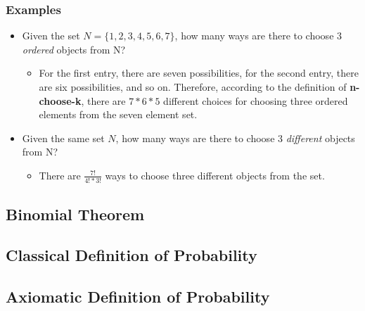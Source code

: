 \documentclass{article}
\begin{document}
\subsubsection{Examples}
\begin{itemize}
    \item Given the set $N = \{1, 2, 3, 4, 5, 6, 7\}$, how many ways are there to choose 3 \textit{ordered} objects from N?
    \begin{itemize}
        \item For the first entry, there are seven possibilities, for the second entry, there are six possibilities, and so on. Therefore, according to the definition of \textbf{n-choose-k}, there are $7*6*5$ different choices for choosing three ordered elements from the seven element set.
    \end{itemize}
    \item Given the same set $N$, how many ways are there to choose 3 \textit{different} objects from N?
    \begin{itemize}
        \item There are $\frac{7!}{4!*3!}$ ways to choose three different objects from the set.
    \end{itemize}
\end{itemize}

\subsection{Binomial Theorem}

\subsection{Classical Definition of Probability}

\subsection{Axiomatic Definition of Probability}
\end{document}
